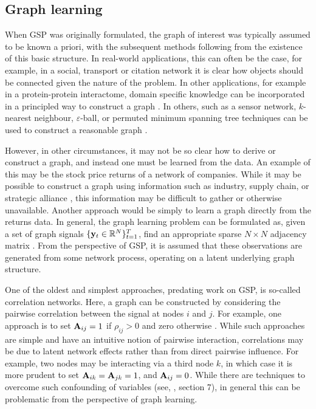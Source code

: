 \subsection{Graph learning}

When GSP was originally formulated, the graph of interest was typically assumed to be known a priori, with the subsequent methods following from the existence of this basic structure. In real-world applications, this can often be the case, for example, in a social, transport or citation network it is clear how objects should be connected given the nature of the problem. In other applications, for example in a protein-protein interactome, domain specific knowledge can be incorporated in a principled way to construct a graph \citep{Li2023}. In others, such as a sensor network, $k$-nearest neighbour, $\varepsilon$-ball, or permuted minimum spanning tree techniques can be used to construct a reasonable graph \citep{Qiao2018}. 

However, in other circumstances, it may not be so clear how to derive or construct a graph, and instead one must be learned from the data. An example of this may be the stock price returns of a network of companies. While it may be possible to construct a graph using information such as industry, supply chain, or strategic alliance \citep{Gao2021,Cheng2021}, this information may be difficult to gather or otherwise unavailable. Another approach would be simply to learn a graph directly from the returns data. In general, the graph learning problem can be formulated as, given a set of graph signals $\{\mathbf{y}_t \in \mathbb{R}^N\}_{t=1}^T$, find an appropriate sparse $N \times N$ adjacency matrix \citep{Dong2019}. From the perspective of GSP, it is assumed that these observations are generated from some network process, operating on a latent underlying graph structure. 

One of the oldest and simplest approaches, predating work on GSP, is so-called correlation networks. Here, a graph can be constructed by considering the pairwise correlation between the signal at nodes $i$ and $j$. For example, one approach is to set $\mathbf{A}_{ij} = 1$ if $\rho_{ij} > 0$ and zero otherwise \citep{Mateos2019}. While such approaches are simple and have an intuitive notion of pairwise interaction, correlations may be due to latent network effects rather than from direct pairwise influence. For example, two nodes may be interacting via a third node $k$, in which case it is more prudent to set $\mathbf{A}_{ik} = \mathbf{A}_{jk} = 1$, and $\mathbf{A}_{ij} = 0$. While there are techniques to overcome such confounding of variables (see, \cite{Kolaczyk2009}, section 7), in general this can be problematic from the perspective of graph learning. 

